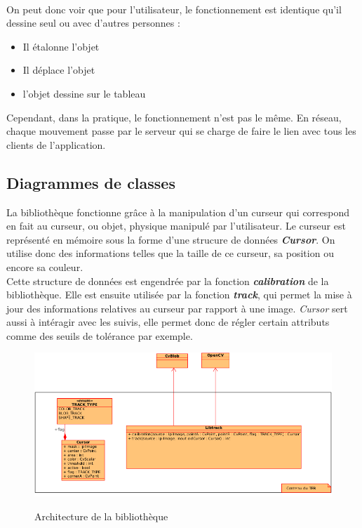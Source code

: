 \documentclass{report}
\begin{document}
				\paragraph{}
				On peut donc voir que pour l'utilisateur, le fonctionnement est identique qu'il dessine seul ou avec d'autres personnes :
				\begin{itemize}
					\item Il étalonne l'objet
					\item Il déplace l'objet
					\item l'objet dessine sur le tableau
				\end{itemize}
				Cependant, dans la pratique, le fonctionnement n'est pas le même. En réseau, chaque mouvement passe par le serveur qui se charge de faire le lien avec tous les clients de l'application.

			\newpage
			\subsection{Diagrammes de classes}
				La bibliothèque fonctionne grâce à la manipulation d'un curseur qui correspond en fait au curseur, ou objet, physique manipulé par l'utilisateur.
				Le curseur est représenté en mémoire sous la forme d'une strucure de données \textbf{\textit{Cursor}}. On utilise donc des informations telles que la taille de ce curseur, sa position ou encore sa couleur.\\
				Cette structure de données est engendrée par la fonction \textit{\textbf{calibration}} de la bibliothèque. Elle est ensuite utilisée par la fonction \textit{\textbf{track}}, qui permet la mise à jour des informations relatives au curseur par rapport à une image. \textit{Cursor} sert aussi à intéragir avec les suivis, elle permet donc de régler certain attributs comme des seuils de tolérance par exemple. \\
				\begin{figure}[!h]
						\centering
						\includegraphics[scale=0.8]{../images/libtrack-uml.png}\\
						\caption{Architecture de la bibliothèque}
						\label{Architecture de la bibliothèque}
				\end{figure}
				
\end{document}

